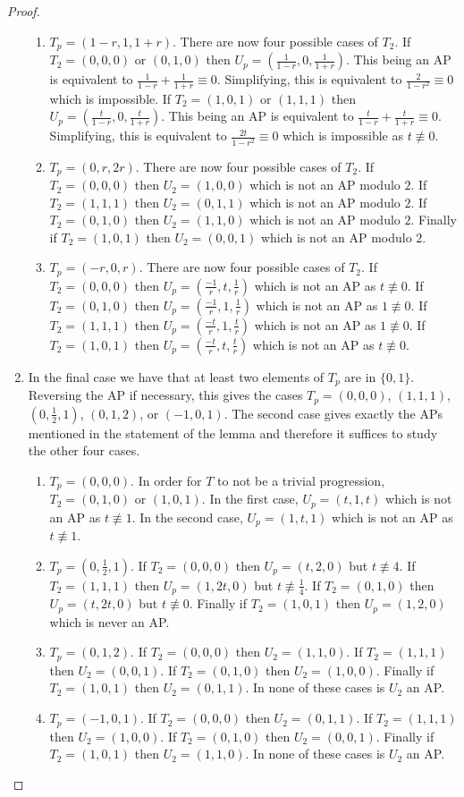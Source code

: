 \documentclass[12pt]{amsart}
\theoremstyle{definition}
\theoremstyle{remark}
\begin{document}
\begin{proof}
\begin{enumerate}
\begin{enumerate}
\item $T_p=(1-r,1,1+r).$ There are now four possible cases of $T_2$. If $T_2=(0,0,0)$ or $(0,1,0)$ then $U_p=(\frac{1}{1-r},0,\frac{1}{1+r})$. This being an AP is equivalent to $\frac{1}{1-r}+\frac{1}{1+r}\equiv 0$. Simplifying, this is equivalent to $\frac{2}{1-r^2}\equiv 0$ which is impossible. If $T_2=(1,0,1)$ or $(1,1,1)$ then $U_p=(\frac{t}{1-r},0,\frac{t}{1+r})$. This being an AP is equivalent to $\frac{t}{1-r}+\frac{t}{1+r}\equiv 0$. Simplifying, this is equivalent to $\frac{2t}{1-r^2}\equiv 0$ which is impossible as $t\nequiv 0$.
\item $T_p=(0,r,2r).$ There are now four possible cases of $T_2$. If $T_2=(0,0,0)$ then $U_2=(1,0,0)$ which is not an AP modulo $2$. If $T_2=(1,1,1)$ then $U_2=(0,1,1)$ which is not an AP modulo $2$. If $T_2=(0,1,0)$ then $U_2=(1,1,0)$ which is not an AP modulo $2$. Finally if $T_2=(1,0,1)$ then $U_2=(0,0,1)$ which is not an AP modulo $2$. 
\item $T_p=(-r,0,r).$ There are now four possible cases of $T_2$. If $T_2=(0,0,0)$ then $U_p=(\frac{-1}{r},t,\frac{1}{r})$ which is not an AP as $t\nequiv 0$. If $T_2=(0,1,0)$ then $U_p=(\frac{-1}{r},1,\frac{1}{r})$ which is not an AP as $1\nequiv 0$. If $T_2=(1,1,1)$ then $U_p=(\frac{-t}{r},1,\frac{t}{r})$ which is not an AP as $1\nequiv 0$. If $T_2=(1,0,1)$ then $U_p=(\frac{-t}{r},t,\frac{t}{r})$ which is not an AP as $t\nequiv 0$. 
\end{enumerate}
\item In the final case we have that at least two elements of $T_p$ are in $\{0,1\}.$ Reversing the AP if necessary, this gives the cases $T_p=(0,0,0)$, $(1,1,1)$, $(0,\frac{1}{2},1)$, $(0,1,2)$, or $(-1,0,1)$. The second case gives exactly the APs mentioned in the statement of the lemma and therefore it suffices to study the other four cases.
\begin{enumerate}
\item $T_p=(0,0,0)$. In order for $T$ to not be a trivial progression, $T_2=(0,1,0)$ or $(1,0,1).$ In the first case, $U_p=(t,1,t)$ which is not an AP as $t\nequiv 1$. In the second case, $U_p=(1,t,1)$ which is not an AP as $t\nequiv 1$.
\item $T_p=(0,\frac{1}{2},1).$ If $T_2=(0,0,0)$ then $U_p=(t,2,0)$ but $t\nequiv 4$. If $T_2=(1,1,1)$ then $U_p=(1,2t,0)$ but $t\nequiv \frac{1}{4}$. If $T_2=(0,1,0)$ then $U_p=(t,2t,0)$ but $t\nequiv 0$. Finally if $T_2=(1,0,1)$ then $U_p=(1,2,0)$ which is never an AP.
\item $T_p=(0,1,2).$ If $T_2=(0,0,0)$ then $U_2=(1,1,0)$. If $T_2=(1,1,1)$ then $U_2=(0,0,1)$. If $T_2=(0,1,0)$ then $U_2=(1,0,0)$. Finally if $T_2=(1,0,1)$ then $U_2=(0,1,1)$. In none of these cases is $U_2$ an AP.
\item $T_p=(-1,0,1).$ If $T_2=(0,0,0)$ then $U_2=(0,1,1)$. If $T_2=(1,1,1)$ then $U_2=(1,0,0)$. If $T_2=(0,1,0)$ then $U_2=(0,0,1)$. Finally if $T_2=(1,0,1)$ then $U_2=(1,1,0)$. In none of these cases is $U_2$ an AP.
\end{enumerate}
\end{enumerate}
\end{proof}
\end{document}
